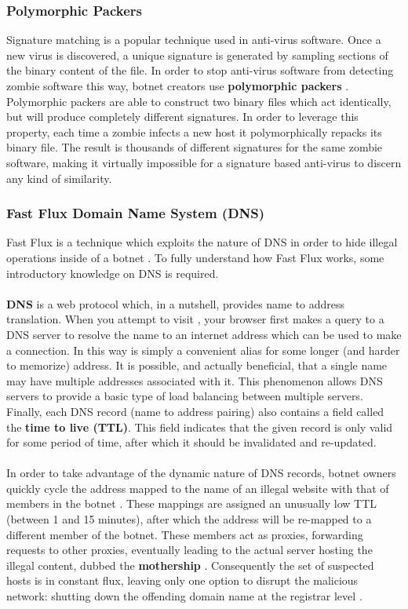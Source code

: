 \subsubsection{Polymorphic Packers}
Signature matching is a popular technique used in anti-virus software.  Once a new
virus is discovered, a unique signature is generated by sampling sections of the
binary content of the file. In order to stop anti-virus software from detecting
zombie software this way, botnet creators use \textbf{polymorphic packers} \cite{botlab}.
Polymorphic packers are able to construct two binary files which act identically, but will
produce completely different signatures. In order to leverage this property, each
time a zombie infects a new host it polymorphically repacks its binary file.  The result
is thousands of different signatures for the same zombie software, making it virtually
impossible for a signature based anti-virus to discern any kind of similarity.

\subsubsection{Fast Flux Domain Name System (DNS)}
Fast Flux is a technique which exploits the nature of DNS in order to hide illegal
operations inside of a botnet \cite{fastflux}. To fully understand how Fast Flux works,
some introductory knowledge on DNS is required.
\\ \\
\textbf{DNS} is a web protocol which, in a nutshell, provides name to address translation.
When you attempt to visit , your browser first makes a query to
a DNS server to resolve the name  to an internet address which can
be used to make a connection.  In this way  is simply a convenient
alias for some longer (and harder to memorize) address. It is possible, and actually
beneficial, that a single name may have multiple addresses associated with it. This phenomenon
allows DNS servers to provide a basic type of load balancing between multiple servers.
Finally, each DNS record (name to address pairing) also contains a field called
the \textbf{time to live (TTL)}. This field indicates that the given record is only
valid for some period of time, after which it should be invalidated and re-updated.
\\ \\
In order to take advantage of the dynamic nature of DNS records, botnet owners
quickly cycle the address mapped to the name of an illegal website with that
of members in the botnet \cite{fastflux}. These mappings are assigned an unusually low TTL
(between 1 and 15 minutes), after which the address will be re-mapped to a
different member of the botnet.  These members act as proxies, forwarding requests to other proxies,
eventually leading to the actual server hosting the illegal content,
dubbed the \textbf{mothership} \cite{fastflux}. Consequently the set of suspected
hosts is in constant flux, leaving only one option to disrupt the malicious network:
shutting down the offending domain name at the registrar level \cite{fastflux}.


